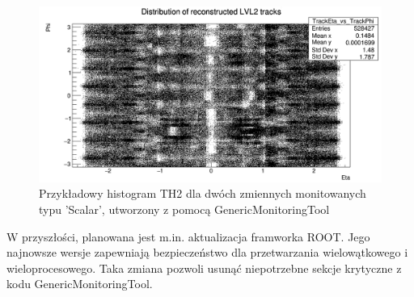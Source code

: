 \begin{figure}[!ht]
\centering
\includegraphics[width=1\textwidth]{img/histogram_TH2.png}
\caption{
Przykładowy histogram TH2 dla dwóch zmiennych monitowanych typu 'Scalar', utworzony z pomocą GenericMonitoringTool 
}
\label{fig:athena:histogram_TH2}
\end{figure}

W przyszłości, planowana jest m.in. aktualizacja framworka ROOT.
Jego najnowsze wersje zapewniają bezpieczeństwo dla przetwarzania wielowątkowego i wieloprocesowego. 
Taka zmiana pozwoli usunąć niepotrzebne sekcje krytyczne z kodu GenericMonitoringTool.
